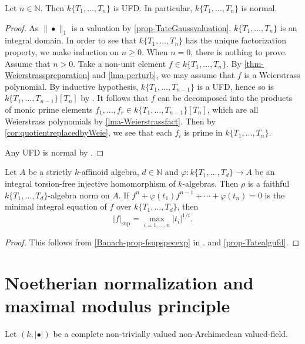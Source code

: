 \begin{proposition}\label{prop-Tatealgufd}
    Let $n\in \mathbb{N}$. Then $k\{T_1,\ldots,T_n\}$ is UFD. In particular, $k\{T_1,\ldots,T_n\}$ is normal.
\end{proposition}
\begin{proof}
    As $\|\bullet\|_1$ is a valuation by \cref{prop-TateGaussvaluation}, $k\{T_1,\ldots,T_n\}$ is an integral domain. In order to see that $k\{T_1,\ldots,T_n\}$ has the unique factorization property, we make induction on $n\geq 0$. When $n=0$, there is nothing to prove. Assume that $n>0$. Take a non-unit element $f\in k\{T_1,\ldots,T_n\}$. By \cref{thm-Weierstrasspreparation} and \cref{lma-perturb}, we may assume that $f$ is a Weierstrass polynomial. By inductive hypothesis, $k\{T_1,\ldots,T_{n-1}\}$ is a UFD, hence so is $k\{T_1,\ldots,T_{n-1}\}[T_n]$ by \cite[\href{https://stacks.math.columbia.edu/tag/0BC1}{Tag 0BC1}]{stacks-project}. It follows that $f$ can be decomposed into the products of monic prime elements $f_1,\ldots,f_r\in k\{T_1,\ldots,T_{n-1}\}[T_n]$, which are all Weierstrass polynomials by \cref{lma-Weierstrassfact}. Then by \cref{cor:quotientreplacedbyWeie}, we see that each $f_i$ is prime in $k\{T_1,\ldots,T_{n}\}$.

    Any UFD is normal by \cite[\href{https://stacks.math.columbia.edu/tag/0AFV}{Tag 0AFV}]{stacks-project}.
\end{proof}


\begin{corollary}\label{cor-rhofaithful}
    Let $A$ be a strictly $k$-affinoid algebra, $d\in \mathbb{N}$ and $\varphi:k\{T_1,\ldots,T_d\}\rightarrow A$ be an integral torsion-free injective homomorphism of $k$-algebras. Then $\rho$ is a faithful $k\{T_1,\ldots,T_d\}$-algebra norm on $A$. If $f^n+\varphi(t_1)f^{n-1}+\cdots+\varphi(t_n)=0$ is the minimal integral equation of $f$ over $k\{T_1,\ldots,T_d\}$, then 
    \[
        |f|_{\sup}=\max_{i=1,\ldots,n} |t_i|^{1/i}.  
    \]
\end{corollary}
\begin{proof}
    This follows from \cref{Banach-prop-fsupspecexp} in . and \cref{prop-Tatealgufd}.
\end{proof}


\section{Noetherian normalization and maximal modulus principle}
Let $(k,|\bullet|)$ be a complete non-trivially valued non-Archimedean valued-field. 

